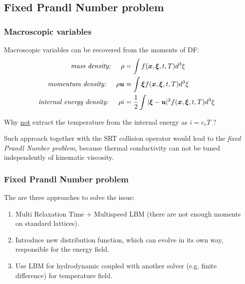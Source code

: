 \documentclass[10pt]{beamer}
\begin{document}
\subsection{Fixed Prandl Number problem}
\begin{frame}\frametitle{Macroscopic variables}
Macroscopic variables can be recovered from the moments of DF:
\begin{align*}  
\textit{mass density: \hspace{1em}} \rho &= \int f(\boldsymbol{x} , \boldsymbol{\xi}, t, T) d^3 \xi \\
\textit{momentum density: \hspace{1em}} \rho \boldsymbol{u} &= \int  \boldsymbol{\xi} f(\boldsymbol{x} , \boldsymbol{\xi}, t, T) d^3 \xi \\
\textit{internal energy density: \hspace{1em}} \rho i&= \dfrac{1}{2} \int |\boldsymbol{\xi} - \boldsymbol{u}|^2 f(\boldsymbol{x} , \boldsymbol{\xi}, t, T) d^3 \xi
\end{align*}

Why \underline{not} extract the temperature from the internal energy as $i=c_v T$ ?

\pause
Such approach together with the SRT collision operator would lead to the \textit{fixed Prandl Number problem}, 
because thermal conductivity can not be tuned independently of kinematic viscosity. %

\end{frame}

\begin{frame}\frametitle{Fixed Prandl Number problem}
The are three approaches to solve the issue:
\begin{enumerate}
\item Multi Relaxation Time + Multispeed LBM (there are not enough moments on standard lattices). 
\item Introduce new distribution function, which can evolve in its own way, responsible for the energy field. 
\item Use LBM for hydrodynamic coupled with another solver (e.g. finite difference) for temperature field.
\end{enumerate}
\end{frame}
\end{document}
